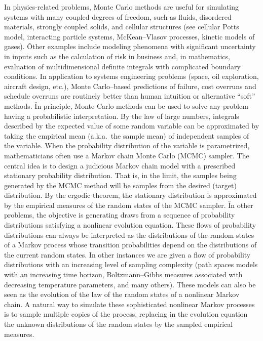 In physics-related problems, Monte Carlo methods are useful for simulating systems with many coupled degrees of
freedom, such as fluids, disordered materials, strongly coupled solids, and cellular structures (see cellular Potts
model, interacting particle systems, McKean–Vlasov processes, kinetic models of gases). \v

Other examples include modeling phenomena with significant uncertainty in inputs such as the calculation of risk in
business and, in mathematics, evaluation of multidimensional definite integrals with complicated boundary conditions.
In application to systems engineering problems (space, oil exploration, aircraft design, etc.), Monte Carlo–based
predictions of failure, cost overruns and schedule overruns are routinely better than human intuition or alternative
``soft'' methods. \v

In principle, Monte Carlo methods can be used to solve any problem having a probabilistic interpretation. By the law
of large numbers, integrals described by the expected value of some random variable can be approximated by taking the
empirical mean (a.k.a.\ the sample mean) of independent samples of the variable. When the probability distribution of
the variable is parametrized, mathematicians often use a Markov chain Monte Carlo (MCMC) sampler. The central idea is
to design a judicious Markov chain model with a prescribed stationary probability distribution. That is, in the
limit, the samples being generated by the MCMC method will be samples from the desired (target) distribution. By the
ergodic theorem, the stationary distribution is approximated by the empirical measures of the random states of the
MCMC sampler. \v

In other problems, the objective is generating draws from a sequence of probability distributions satisfying a
nonlinear evolution equation. These flows of probability distributions can always be interpreted as the distributions
of the random states of a Markov process whose transition probabilities depend on the distributions of the current
random states. In other instances we are given a flow of probability distributions with an increasing level of
sampling complexity (path spaces models with an increasing time horizon, Boltzmann–Gibbs measures associated with
decreasing temperature parameters, and many others). These models can also be seen as the evolution of the law of the
random states of a nonlinear Markov chain. A natural way to simulate these sophisticated nonlinear Markov processes
is to sample multiple copies of the process, replacing in the evolution equation the unknown distributions of the
random states by the sampled empirical measures.

